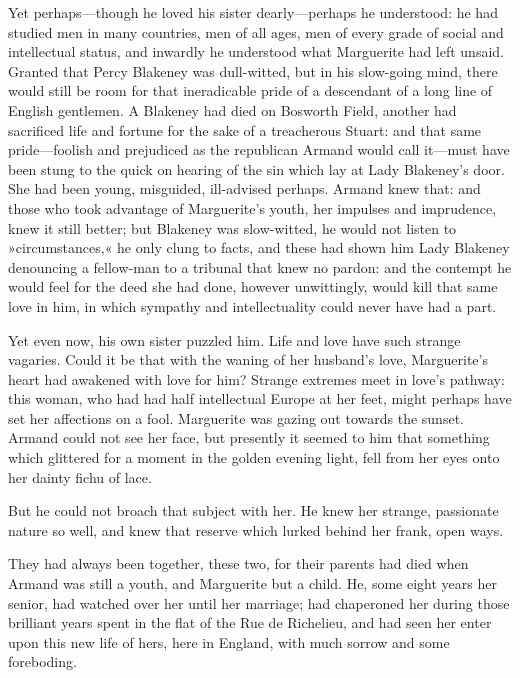Yet perhaps\allowbreak---\allowbreak though he loved his sister dearly\allowbreak---\allowbreak perhaps he understood: he had studied men in many countries, men of all ages, men of every grade of social and intellectual status, and inwardly he understood what Marguerite had left unsaid. Granted that Percy Blakeney was dull-witted, but in his slow-going mind, there would still be room for that ineradicable pride of a descendant of a long line of English gentlemen. A Blakeney had died on Bosworth Field, another had sacrificed life and fortune for the sake of a treacherous Stuart: and that same pride\allowbreak---\allowbreak foolish and prejudiced as the republican Armand would call it\allowbreak---\allowbreak must have been stung to the quick on hearing of the sin which lay at Lady Blakeney's door. She had been young, misguided, ill-advised perhaps. Armand knew that: and those who took advantage of Marguerite's youth, her impulses and imprudence, knew it still better; but Blakeney was slow-witted, he would not listen to »circumstances,« he only clung to facts, and these had shown him Lady Blakeney denouncing a fellow-man to a tribunal that knew no pardon: and the contempt he would feel for the deed she had done, however unwittingly, would kill that same love in him, in which sympathy and intellectuality could never have had a part.

Yet even now, his own sister puzzled him. Life and love have such strange vagaries. Could it be that with the waning of her husband's love, Marguerite's heart had awakened with love for him? Strange extremes meet in love's pathway: this woman, who had had half intellectual Europe at her feet, might perhaps have set her affections on a fool. Marguerite was gazing out towards the sunset. Armand could not see her face, but presently it seemed to him that something which glittered for a moment in the golden evening light, fell from her eyes onto her dainty fichu of lace.

But he could not broach that subject with her. He knew her strange, passionate nature so well, and knew that reserve which lurked behind her frank, open ways.

They had always been together, these two, for their parents had died when Armand was still a youth, and Marguerite but a child. He, some eight years her senior, had watched over her until her marriage; had chaperoned her during those brilliant years spent in the flat of the Rue de Richelieu, and had seen her enter upon this new life of hers, here in England, with much sorrow and some foreboding.

